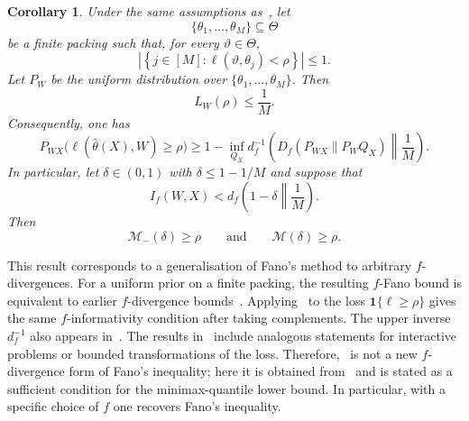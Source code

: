 \documentclass[11pt]{article}
\newtheorem{corollary}[theorem]{Corollary}
\theoremstyle{definition}
\theoremstyle{remark}
\newcommand{\1}{\boldsymbol{1}}
\begin{document}
\begin{corollary}
\label{cor:fFano}
Under the same assumptions as~, let
\[
\{\theta_1,\ldots,\theta_M\}\subseteq\Theta
\]
be a finite packing such that, for every $\vartheta\in\Theta$,
\begin{equation}
    \left|
    \left\{
    j\in[M]:
    \ell(\vartheta,\theta_j)<\rho
    \right\}
    \right|
    \leq 1.
\end{equation}
Let $P_W$ be the uniform distribution over
$\{\theta_1,\ldots,\theta_M\}$. Then
\begin{equation}
    L_W(\rho)\leq \frac{1}{M}.
\end{equation}
Consequently, one has
\begin{equation}
    P_{WX}\bigl(\ell(\widehat\theta(X),W)\geq\rho\bigr)
    \geq
    1-
    \inf_{Q_X}
    d_f^{-1}
    \left(
    D_f(P_{WX}\|P_WQ_X)
    \middle\|
    \frac{1}{M}
    \right).
\end{equation}
In particular, let $\delta\in(0,1)$ with $\delta\leq1-1/M$ and suppose that
\begin{equation}
   I_f(W,X)
    <
    d_f\left(
    1-\delta
    \middle\|
    \frac{1}{M}
    \right).
\end{equation}
Then
\begin{equation}
    \mathcal M_{-}(\delta)\geq\rho
    \qquad\text{and}\qquad
    \mathcal M(\delta)\geq\rho.
\end{equation}
\end{corollary}
This result corresponds to a generalisation of Fano's method to arbitrary $f$-divergences. For a uniform prior on a finite packing, the resulting $f$-Fano bound is equivalent to earlier $f$-divergence bounds~\cite{Gushchin2003,Guntuboyina2011}. Applying~\cite[Theorem~2]{ChenGuntuboyinaZhang2016} to the loss $\mathbf 1\{\ell\geq\rho\}$ gives the same $f$-informativity condition after taking complements. The upper inverse $d_f^{-1}$ also appears in~\cite[Theorem~1]{MajumdarMeiPacelli2023}. The results in~\cite{ChenFosterHanQianRakhlinXu2024,BongoleOechteringSkoglund2026,BongoleZamaniOechteringSkoglund2026} include analogous statements for interactive problems or bounded transformations of the loss. Therefore,~ is not a new $f$-divergence form of Fano's inequality; here it is obtained from~ and is stated as a sufficient condition for the minimax-quantile lower bound.
In particular, with a specific choice of $f$ one recovers Fano's inequality.
\end{document}
